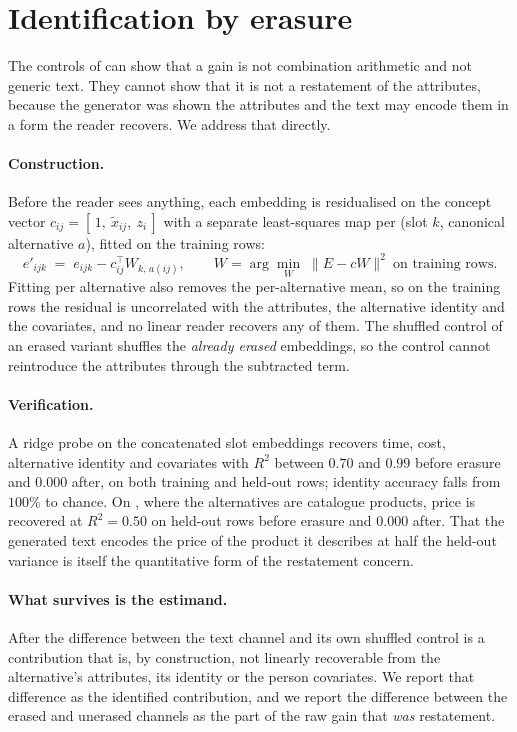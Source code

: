\section{Identification by erasure}
\label{sec:identification}

The controls of  can show that a gain is not combination arithmetic and not
generic text. They cannot show that it is not a restatement of the attributes, because the
generator was shown the attributes and the text may encode them in a form the reader recovers.
We address that directly.

\paragraph{Construction.} Before the reader sees anything, each embedding is residualised on
the concept vector $c_{ij} = [\,1,\ \tilde x_{ij},\ z_i\,]$ with a separate least-squares map
per (slot $k$, canonical alternative $a$), fitted on the training rows:
\begin{equation}
e'_{ijk} \;=\; e_{ijk} - c_{ij}^{\top} W_{k,\,a(ij)},
\qquad
W = \arg\min_W \; \lVert E - cW \rVert^2 \ \text{on training rows}.
\label{eq:erase}
\end{equation}
Fitting per alternative also removes the per-alternative mean, so on the training rows the
residual is uncorrelated with the attributes, the alternative identity and the covariates, and
no linear reader recovers any of them. The shuffled control of an erased variant shuffles the
\emph{already erased} embeddings, so the control cannot reintroduce the attributes through the
subtracted term.

\paragraph{Verification.} A ridge probe on the concatenated slot embeddings recovers time,
cost, alternative identity and covariates with $R^2$ between $0.70$ and $0.99$ before erasure
and $0.000$ after, on both training and held-out rows; identity accuracy falls from $100\%$ to
chance. On , where the alternatives are catalogue products, price is recovered
at $R^2 = 0.50$ on held-out rows before erasure and $0.000$ after. That the generated text
encodes the price of the product it describes at half the held-out variance is itself the
quantitative form of the restatement concern.

\paragraph{What survives is the estimand.} After  the difference between the
text channel and its own shuffled control is a contribution that is, by construction, not
linearly recoverable from the alternative's attributes, its identity or the person covariates.
We report that difference as the identified contribution, and we report the difference between
the erased and unerased channels as the part of the raw gain that \emph{was} restatement.

